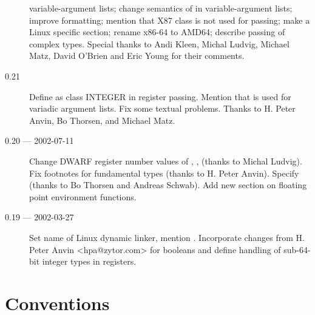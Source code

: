 \documentclass[12pt]{report}
\begin{document}
\begin{description}
  variable-argument lists; change semantics of \RAX in
  variable-argument lists; improve formatting; mention that X87 class
  is not used for passing; make  a Linux specific
  section; rename x86-64 to AMD64; describe passing of complex types.
  Special thanks to Andi Kleen, Michal Ludvig, Michael Matz, David
  O'Brien and Eric Young for their comments.
\item[0.21] Define  as class INTEGER in register
  passing.  Mention that  is used for variadic argument lists.  Fix
  some textual problems.  Thanks to H. Peter Anvin, Bo Thorsen, and
  Michael Matz.
\item[0.20 --- 2002-07-11] Change DWARF register number values of
  \RBX, \RSI, \RSI (thanks to Michal Ludvig).  Fix footnotes for
  fundamental types (thanks to H. Peter Anvin). Specify 
  (thanks to Bo Thorsen and Andreas Schwab).  Add new section on
  floating point environment functions.
\item[0.19 --- 2002-03-27] Set name of Linux dynamic linker, mention
  .
  Incorporate changes from H. Peter Anvin <hpa@zytor.com>
  for booleans and define handling of sub-64-bit integer types in
  registers.
\end{description}










\chapter{Conventions}





\appendix


\end{document}
